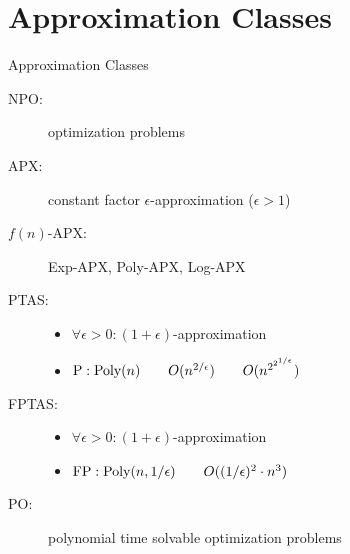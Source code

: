 \section{Approximation Classes}

\begin{frame}{Approximation Classes}
  \begin{description}
	\item[NPO:] \np{} optimization problems
	\item[APX:] constant factor $\epsilon$-approximation ($\epsilon > 1$)
	\item[$f(n)$-APX:] Exp-APX, Poly-APX, Log-APX
	\item[PTAS:] 
	  \begin{itemize}
		\item $\forall \epsilon > 0: (1 + \epsilon)$-approximation
		\item $\text{P}: \text{Poly}(n) \qquad O(n^{2/\epsilon}) \qquad O(n^{2^{2^{1/\epsilon}}})$
	  \end{itemize}
	\item[FPTAS:] 
	  \begin{itemize}
		\item $\forall \epsilon > 0: (1 + \epsilon)$-approximation
		\item $\text{FP}: \text{Poly}(n, 1/\epsilon) \qquad O((1/\epsilon)^2 \cdot n^3)$
	  \end{itemize}
	\item[PO:] polynomial time solvable optimization problems
  \end{description}
\end{frame}
